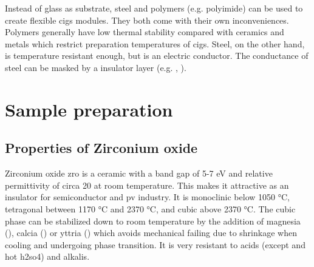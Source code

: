 %
Instead of glass as substrate, steel and polymers (e.g. polyimide\cite{feurer2017cigs}) can be used to create flexible \gls{cigs} modules. 
They both come with their own inconveniences. 
Polymers generally have low thermal stability compared with ceramics and metals which restrict preparation temperatures of \gls{cigs}.
Steel, on the other hand, is temperature resistant enough, but is an electric conductor. 
The conductance of steel can be masked by a insulator layer (e.g. , ).

\pagebreak[4]

\section{Sample preparation}
\subsection{Properties of Zirconium oxide}
Zirconium oxide \gls{zro} is a ceramic with a band gap of 5-7 eV\cite{Anwar2017} and relative permittivity of circa 20 at room temperature\cite{kukli2001dielectric}. 
This makes it attractive as an insulator for semiconductor and \gls{pv} industry. 
It is monoclinic below 1050 °C, tetragonal between 1170 °C and 2370 °C, and cubic above 2370 °C\cite{Nielsen2005}.
The cubic phase can be stabilized down to room temperature by the addition of magnesia (), calcia () or yttria () which avoids mechanical failing due to shrinkage 
when cooling and undergoing phase transition\cite{Nielsen2005}.
It is very resistant to acids (except  and hot \gls{h2so4}) and alkalis\cite{Nielsen2005}.

